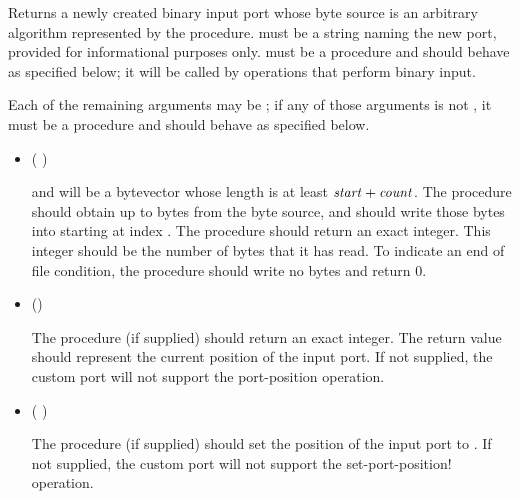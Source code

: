\begin{entry}{%
}

Returns a newly created binary input port whose byte source is
an arbitrary algorithm represented by the  procedure.
 must be a string naming the new port,
provided for informational purposes only.
 must be a procedure and should behave as specified
below; it will be called by operations that perform binary input.

Each of the remaining arguments may be \schfalse{}; if any of
those arguments is not \schfalse{}, it must be a procedure and
should behave as specified below.
   
\begin{itemize}
\item {\cf (   )}
       
  and  will be a bytevector whose length is at least
  $\textnormal{\textit{start}} + \textnormal{\textit{count}}$.
  The  procedure should obtain up to  bytes
  from the byte source, and should write those bytes
  into  starting at index .
  The  procedure should return an exact integer.  This
  integer should be the number of bytes that it has read.
  To indicate an end of file condition, the 
  procedure should write no bytes and return 0.

\item {\cf ()}
       
  The  procedure (if supplied) should return an exact
  integer.  The return value should represent the current position of
  the input port.  If not supplied, the custom port will not support
  the {\cf port-position} operation.
  
\item {\cf ( )}
       
  The  procedure (if supplied) should set the
  position of the input port to .  If not supplied, the custom
  port will not support the {\cf set-port-position!} operation.
       

\end{itemize}
\end{entry}
